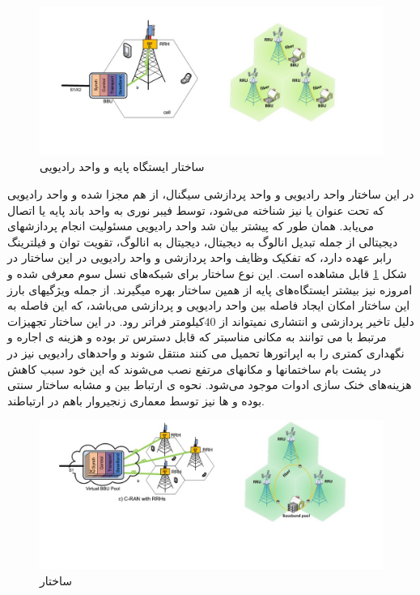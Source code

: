 \begin{figure}
  \centering
    \includegraphics[scale=0.7]{./fig/c22}
  \caption{ ساختار ایستگاه پایه و واحد رادیویی \cite{checko2015cloud}}
  \label{fig:c22}
\end{figure}
در این ساختار واحد رادیویی و واحد پردازشی سیگنال، از هم
مجزا شده و واحد رادیویی که تحت عنوان  یا 
نیز شناخته می‌شود، توسط فیبر نوری به واحد باند پایه یا  اتصال می‌یابد. همان طور که پیشتر بیان شد واحد رادیویی مسئولیت
انجام پردازشهای دیجیتالی از جمله تبدیل انالوگ به
دیجیتال، دیجیتال به انالوگ، تقویت توان و فیلترینگ رابر عهده دارد، که تفکیک وظایف واحد پردازشی و واحد
رادیویی در این ساختار در شکل \ref{fig:c22} قابل مشاهده است. این
نوع ساختار برای شبکه‌های نسل سوم معرفی شده و امروزه
نیز بیشتر ایستگاه‌های پایه از همین ساختار بهره میگیرند.
از جمله ویژگیهای بارز این ساختار امکان ایجاد فاصله
بین واحد رادیویی و پردازشی می‌باشد، که این فاصله به
دلیل تاخیر پردازشی و انتشاری نمیتواند از  $40$کیلومتر
فراتر رود. در این ساختار تجهیزات مرتبط با  می
توانند به مکانی مناسبتر که قابل دسترس تر بوده و هزینه
ی اجاره و نگهداری کمتری را به اپراتورها تحمیل می
کنند منتقل شوند و واحدهای رادیویی نیز در در پشت بام
ساختمانها و مکانهای مرتفع نصب می‌شوند که این
خود سبب کاهش هزینه‌های خنک سازی ادوات موجود
می‌شود. نحوه ی ارتباط بین  و  مشابه ساختار
سنتی بوده و ها نیز توسط معماری زنجیروار باهم
در ارتباطند.
\begin{figure}[H]
  \centering
    \includegraphics[scale=0.7]{./fig/c33}
  \caption{ساختار   \cite{checko2015cloud}}
  \label{fig:c33}
\end{figure}
